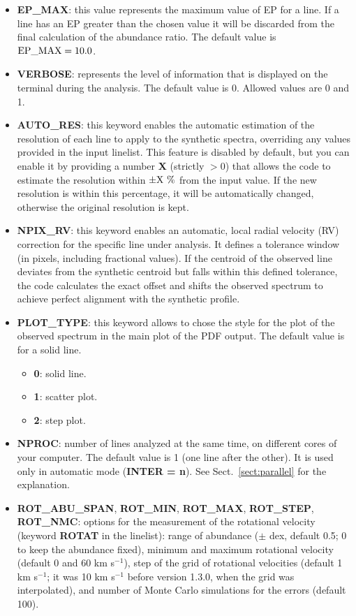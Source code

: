 \documentclass[modern]{aastex701}
\begin{document}
\begin{itemize}
    \item {\bf EP\_MAX}: this value represents the maximum value of EP for a line. If a line has an EP greater than the chosen value it will be discarded from the final calculation of the abundance ratio. The default value is $\rm EP\_MAX = 10.0$.
    \item {\bf VERBOSE}: represents the level of information that is displayed on the terminal during the analysis. The default value is 0. Allowed values are 0 and 1.
    \item {\bf AUTO\_RES}: this keyword enables the automatic estimation of the resolution of each line to apply to the synthetic spectra, overriding any values provided in the input linelist. This feature is disabled by default, but you can enable it by providing a number {\bf X} (strictly $> 0$) that allows the code to estimate the resolution within {\bf $\rm\pm X~\%$} from the input value. If the new resolution is within this percentage, it will be automatically changed, otherwise the original resolution is kept.
    \item {\bf NPIX\_RV}: this keyword enables an automatic, local radial velocity (RV) correction for the specific line under analysis. It defines a tolerance window (in pixels, including fractional values). If the centroid of the observed line deviates from the synthetic centroid but falls within this defined tolerance, the code calculates the exact offset and shifts the observed spectrum to achieve perfect alignment with the synthetic profile.
    \item {\bf PLOT\_TYPE}: this keyword allows to chose the style for the plot of the observed spectrum in the main plot of the PDF output. The default value is for a solid line.
    \begin{itemize}
        \item {\bf 0}: solid line.
        \item {\bf 1}: scatter plot.
        \item {\bf 2}: step plot.
    \end{itemize}
    \item {\bf NPROC}: number of lines analyzed at the same time, on different cores of your computer. The default value is 1 (one line after the other). It is used only in automatic mode ({\bf INTER = n}). See Sect.~\ref{sect:parallel} for the explanation.
    \item {\bf ROT\_ABU\_SPAN}, {\bf ROT\_MIN}, {\bf ROT\_MAX}, {\bf ROT\_STEP}, {\bf ROT\_NMC}: options for the measurement of the rotational velocity (keyword {\bf ROTAT} in the linelist): range of abundance ($\pm$ dex, default 0.5; 0 to keep the abundance fixed), minimum and maximum rotational velocity (default 0 and 60 km s$^{-1}$), step of the grid of rotational velocities (default 1 km s$^{-1}$; it was 10 km s$^{-1}$ before version 1.3.0, when the grid was interpolated), and number of Monte Carlo simulations for the errors (default 100).

\end{itemize}
\end{document}
